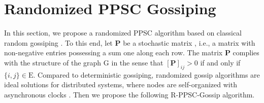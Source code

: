 \documentclass[a4paper, 11pt]{article}
\newcommand{\1}{\mathbf{1}}
\begin{document}
{	%
}



\section{Randomized PPSC Gossiping}\label{sec:rand}

In this section, we propose a randomized PPSC algorithm based on classical random gossiping \cite{boyd2006randomized}. To this end, let $\mathbf{P}$ be a stochastic matrix \cite{horn1990matrix}, i.e., a matrix with non-negative entries possessing a sum one along each row. The matrix  $\mathbf{P}$ complies with the structure of the graph $\mathrm{G}$ in the sense that $[\mathbf{P}]_{ij}>0$ if and only if $\{i,j\}\in \mathrm{E}$. Compared to deterministic gossiping, randomized gossip algorithms are ideal solutions for distributed systems, where nodes are  self-organized with asynchronous clocks \cite{boyd2006randomized}. Then we propose the following R-PPSC-Gossip algorithm. 
\end{document}
